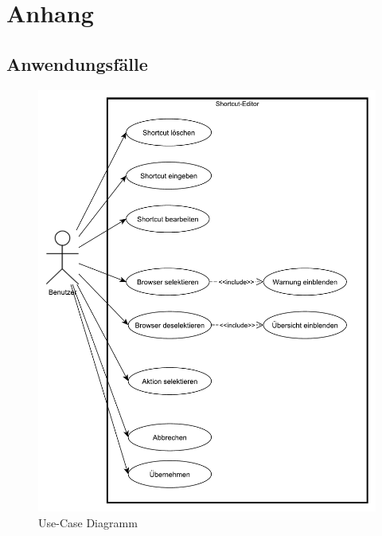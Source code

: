 \section{Anhang}

\subsection{Anwendungsfälle}

\vfill
\begin{figure}[H]
	\centering
	\includegraphics[width=\linewidth]{../graphic/diagrams/UC_Anwendungsfall/Anwendungsfall}
	\caption{Use-Case Diagramm}
	\label{fig:anwendungsfall}
\end{figure}
\vfill

\newpage


